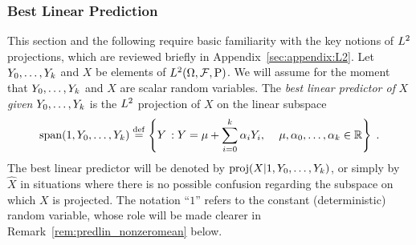 \subsubsection{Best Linear Prediction}
This section and the following require basic familiarity with the key notions
of $L^2$ projections, which are reviewed briefly in
Appendix~\ref{sec:appendix:L2}. Let $Y_0, \dots, Y_k$ and $X$ be elements of
$L^2(\Omega,\mathcal{F},\operatorname{P})$.  We will assume for the moment that $Y_0,
\dots, Y_k$ and $X$ are scalar random variables. The {\em best linear
  predictor of} $X$ {\em given} $Y_0, \dots, Y_k$ is the $L^2$ projection
of $X$ on the linear subspace
\begin{equation*}
\operatorname{span}(1,Y_0, \dots, Y_k) \stackrel{\mathrm{def}}{=}
\left \{ Y \,: Y = \mu + \sum_{i=0}^k \alpha_i Y_i,  \, \quad \text{$\mu, \alpha_0, \dotsc, \alpha_k \in \mathbb{R} $} \right\} \; .
\end{equation*}
The best linear predictor will be denoted by $\operatorname{proj}({X}|1,Y_0, \dots, Y_k)$, or
simply by $\hat{X}$ in situations where there is no possible confusion
regarding the subspace on which $X$ is projected. The notation ``$1$'' refers
to the constant (deterministic) random variable, whose role will be made
clearer in Remark~\ref{rem:predlin_nonzeromean} below.

